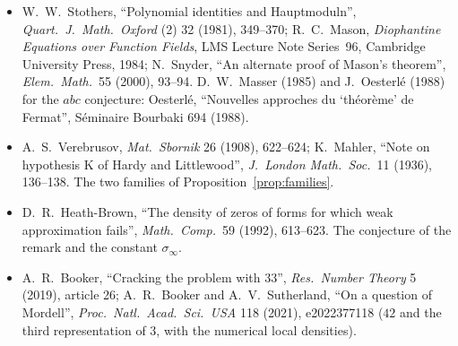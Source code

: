 \begin{itemize}
(infinitely many irregular primes; Washington, Theorem~5.17). C.~L.~Siegel, ``Zu zwei Bemerkungen Kummers'',
\emph{Nachr.\ Akad.\ Wiss.\ G\"ottingen} (1964), 51--57 (the heuristic $e^{-1/2}$; Washington, \S5.3).
\item W.~W.~Stothers, ``Polynomial identities and Hauptmoduln'', \emph{Quart.\ J.\ Math.\ Oxford} (2) 32 (1981), 349--370;
R.~C.~Mason, \emph{Diophantine Equations over Function Fields}, LMS Lecture Note Series~96, Cambridge University Press, 1984;
N.~Snyder, ``An alternate proof of Mason's theorem'', \emph{Elem.\ Math.}\ 55 (2000), 93--94. D.~W.~Masser (1985) and
J.~Oesterl\'e (1988) for the $abc$ conjecture: Oesterl\'e, ``Nouvelles approches du `th\'eor\`eme' de Fermat'',
S\'eminaire Bourbaki 694 (1988).
\item A.~S.~Verebrusov, \emph{Mat.\ Sbornik} 26 (1908), 622--624; K.~Mahler, ``Note on hypothesis K of Hardy and Littlewood'',
\emph{J.\ London Math.\ Soc.}\ 11 (1936), 136--138. The two families of Proposition~\ref{prop:families}.
\item D.~R.~Heath-Brown, ``The density of zeros of forms for which weak approximation fails'', \emph{Math.\ Comp.}\ 59 (1992),
613--623. The conjecture of the remark and the constant $\sigma_\infty$.
\item A.~R.~Booker, ``Cracking the problem with 33'', \emph{Res.\ Number Theory} 5 (2019), article 26; A.~R.~Booker and
A.~V.~Sutherland, ``On a question of Mordell'', \emph{Proc.\ Natl.\ Acad.\ Sci.\ USA} 118 (2021), e2022377118 ($42$ and
the third representation of $3$, with the numerical local densities).
\end{itemize}
